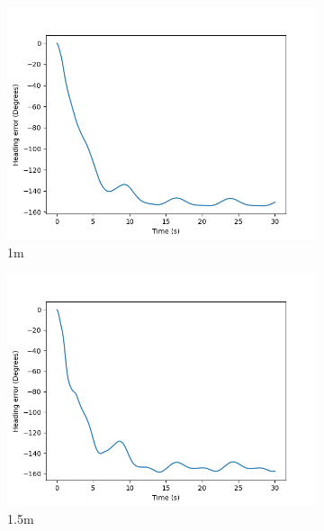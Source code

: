 \documentclass[class=article, crop=false]{standalone}
\begin{document}
\begin{figure}
\begin{subfigure}[b]{0.48\textwidth}
        \includegraphics{scenario1/rov-50m/1.0m/usv_heading_error_uncontrolled}
        \caption{1m}
        \label{}
    \end{subfigure}
    \hfill
    \begin{subfigure}[b]{0.48\textwidth}
        \centering
        \includegraphics{scenario1/rov-50m/1.5m/usv_heading_error_uncontrolled}
        \caption{1.5m}
        \label{}
    \end{subfigure}
    \vfill
    \begin{subfigure}[b]{0.48\textwidth}
        \centering

\end{subfigure}
\end{figure}
\end{document}
